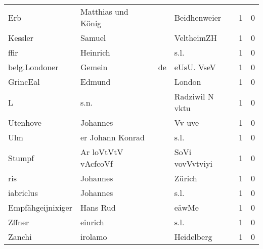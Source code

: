\begin{tabular}{llllrr}
                      Erb &                 Matthias und König &             &                                Beidhenweier &          1 &         0 \\
                  Kessler &                             Samuel &             &                                  VeltheimZH &          1 &         0 \\
                     ffir &                           Heinrich &             &                                        s.l. &          1 &         0 \\
            belg.Londoner &                             Gemein &          de &                                  eUsU. VseV &          1 &         0 \\
                 GrincEal &                             Edmund &             &                                      London &          1 &         0 \\
                        L &                               s.n. &             &                             Radziwil N vktu &          1 &         0 \\
                 Utenhove &                           Johannes &             &                                      Vv uve &          1 &         0 \\
                      Ulm &                   er Johann Konrad &             &                                        s.l. &          1 &         0 \\
                   Stumpf &                Ar loVtVtV vAcfcoVf &             &                             SoVi vovVvtviyi &          1 &         0 \\
                      ris &                           Johannes &             &                                      Zürich &          1 &         0 \\
                iabriclus &                           Johannes &             &                                        s.l. &          1 &         0 \\
        Empfähgeijnixiger &                           Hans Rud &             &                                       eäwMe &          1 &         0 \\
                   Zffner &                            einrich &             &                                        s.l. &          1 &         0 \\
                   Zanchi &                            irolamo &             &                                  Heidelberg &          1 &         0 \\

\end{tabular}
